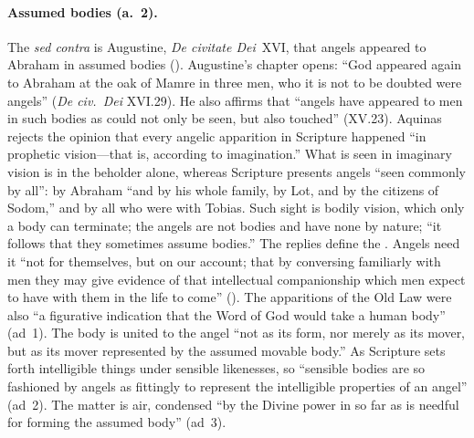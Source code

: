 \paragraph{Assumed bodies (a.~2).} The \emph{sed contra} is Augustine,
\emph{De civitate Dei}~XVI, that angels appeared to Abraham in assumed
bodies (). Augustine's chapter opens: ``God
appeared again to Abraham at the oak of Mamre in three men, who it is not
to be doubted were angels'' (\emph{De civ.\ Dei} XVI.29). He also affirms
that ``angels have appeared to men in such bodies as could not only be
seen, but also touched'' (XV.23). Aquinas rejects the opinion that every
angelic apparition in Scripture happened ``in prophetic vision---that is,
according to imagination.'' What is seen in imaginary vision is in the
beholder alone, whereas Scripture presents angels ``seen commonly by all'':
by Abraham ``and by his whole family, by Lot, and by the citizens of
Sodom,'' and by all who were with Tobias. Such sight is bodily vision, which
only a body can terminate; the angels are not bodies and have none by
nature; ``it follows that they sometimes assume bodies.'' The replies
define the . Angels need it ``not for themselves,
but on our account; that by conversing familiarly with men they may give
evidence of that intellectual companionship which men expect to have with
them in the life to come'' (). The
apparitions of the Old Law were also ``a figurative indication that the
Word of God would take a human body'' (ad~1). The body is united to the
angel ``not as its form, nor merely as its mover, but as its mover
represented by the assumed movable body.'' As Scripture sets forth
intelligible things under sensible likenesses, so ``sensible bodies are so
fashioned by angels as fittingly to represent the intelligible properties
of an angel'' (ad~2). The matter is air, condensed ``by the Divine power in
so far as is needful for forming the assumed body'' (ad~3).

